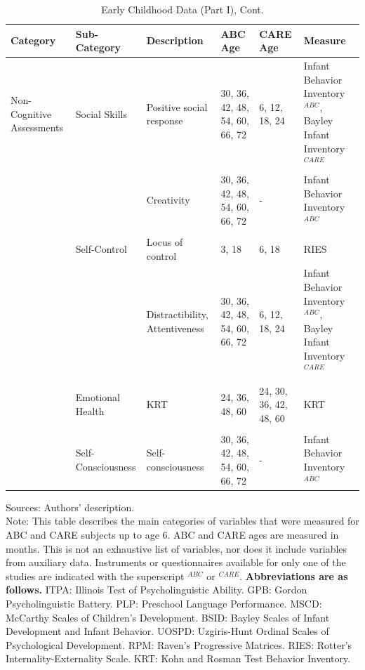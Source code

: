 \documentclass[static]{JJH-Beamer}
\begin{document}
\begin{frame}

\begin{table}[H]
\addtocounter{table}{-1}
\caption{Early Childhood Data (Part I), Cont.}
\begin{center}
\begin{tiny}
\begin{tabular}{L{1.4cm} C{2cm} C{1.5cm} C{1.3cm} C{1.3cm}  C{2cm}}
\toprule
\textbf{Category}	&	\textbf{Sub-Category}	&	\textbf{Description}	&	\textbf{ABC Age}  	&  \textbf{CARE Age}  & 	\textbf{Measure}	\\ \midrule
Non-Cognitive Assessments	&	Social Skills	&	Positive social response	&	30, 36, 42, 48, 54, 60, 66, 72	&	6, 12, 18, 24		&	Infant Behavior Inventory$^{ABC}$, Bayley Infant Inventory$^{CARE}$	\\
	&		&	Creativity	&	30, 36, 42, 48, 54, 60, 66, 72	&	- 	&	Infant Behavior Inventory$^{ABC}$	\\
	&	\\
	&	Self-Control	&	Locus of control	&	3, 18	&	6, 18	& 	RIES	\\
	&		&	Distractibility, Attentiveness	&	30, 36, 42, 48, 54, 60, 66, 72	&	6, 12, 18, 24		&	Infant Behavior Inventory$^{ABC}$, Bayley Infant Inventory$^{CARE}$	\\
	&	\\
	&	Emotional Health	&	KRT	&	24, 36, 48, 60	&	24, 30, 36, 42, 48, 60	&	KRT	\\
	&	\\
	&	Self-Consciousness	&	Self-consciousness	&	30, 36, 42, 48, 54, 60, 66, 72	&	-	&	Infant Behavior Inventory$^{ABC}$	\\
\bottomrule
\end{tabular}
\end{tiny}
\end{center}
\end{table}

\end{frame}

{\flushleft \normalsize Sources: Authors' description. \\	
Note: This table describes the main categories of variables that were measured for ABC and CARE subjects up to age 6. ABC and CARE ages are measured in months. This is not an exhaustive list of variables, nor does it include variables from auxiliary data. Instruments or questionnaires available for only one of the studies are indicated with the superscript $^{ABC}$ or $^{CARE}$.  \textbf{Abbreviations are as follows.} ITPA: Illinois Test of Psycholinguistic Ability. GPB: Gordon Psycholinguistic Battery. PLP: Preschool Language Performance. MSCD: McCarthy Scales of Children's Development. BSID: Bayley Scales of Infant Development and Infant Behavior. UOSPD: Uzgiris-Hunt Ordinal Scales of Psychological Development. RPM: Raven's Progressive Matrices. RIES: Rotter's Internality-Externality Scale. KRT: Kohn and Rosman Test Behavior Inventory.\\}
\clearpage
\end{document}

